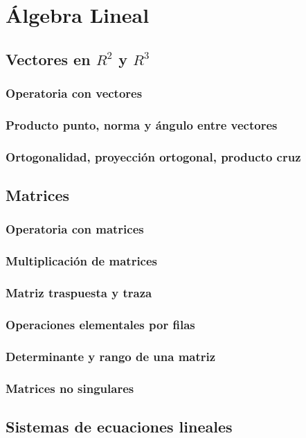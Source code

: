 \section{Álgebra Lineal}

\subsection{Vectores en \texorpdfstring{$R^2$}{R\textasciicircum 2} y \texorpdfstring{$R^3$}{R\textasciicircum 3}}

\subsubsection{Operatoria con vectores}

\subsubsection{Producto punto, norma y ángulo entre vectores}

\subsubsection{Ortogonalidad, proyección ortogonal, producto cruz}

\subsection{Matrices}

\subsubsection{Operatoria con matrices}

\subsubsection{Multiplicación de matrices}

\subsubsection{Matriz traspuesta y traza}

\subsubsection{Operaciones elementales por filas}

\subsubsection{Determinante y rango de una matriz}

\subsubsection{Matrices no singulares}

\subsection{Sistemas de ecuaciones lineales}
